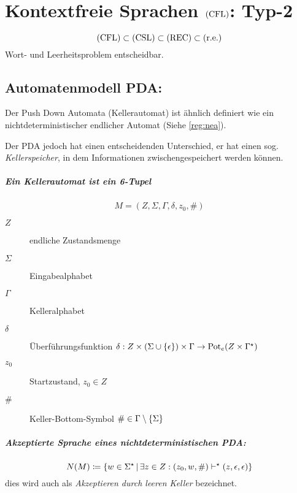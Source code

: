 \chapter{Kontextfreie Sprachen $\mathrm{(CFL)}$: Typ-2}
\begin{equation*}
	\mathrm{(CFL)}\subset\mathrm{(CSL)}\subset\mathrm{(REC)}\subset\mathrm{(r.e.)}
\end{equation*}
Wort- und Leerheitsproblem entscheidbar.

\section{Automatenmodell PDA:}\label{cfl:pda}
Der Push Down Automata (Kellerautomat) ist ähnlich definiert wie ein nichtdeterministischer endlicher Automat (Siehe \autoref{reg:nea}).

Der PDA jedoch hat einen entscheidenden Unterschied, er hat einen sog. \emph{Kellerspeicher}, in dem Informationen zwischengespeichert werden können.

\paragraph{Ein Kellerautomat ist ein 6-Tupel}
\begin{equation*}
	M=(Z,\Sigma,\Gamma,\delta,z_0,\#)
\end{equation*}
\begin{description}
	\item[$Z$] endliche Zustandsmenge
	\item[$\Sigma$] Eingabealphabet
	\item[$\Gamma$] Kelleralphabet
	\item[$\delta$] Überführungsfunktion $\delta:Z\times(\Sigma\cup\left\{ \epsilon \right\})\times\Gamma\rightarrow \mathrm{Pot}_e(Z\times\Gamma^\star)$
	\item[$z_0$] Startzustand, $z_0\in Z$
	\item[$\#$] Keller-Bottom-Symbol $\#\in \Gamma\setminus\left\{ \Sigma \right\}$
\end{description}

\paragraph{Akzeptierte Sprache eines nichtdeterministischen PDA:}
\begin{equation*}
	N(M)\coloneqq\left\{ w\in \Sigma^\star \,\middle|\, \exists z\in Z: (z_0, w, \#)\vdash^\star (z,\epsilon,\epsilon) \right\}
\end{equation*}
dies wird auch als \emph{Akzeptieren durch leeren Keller} bezeichnet.

